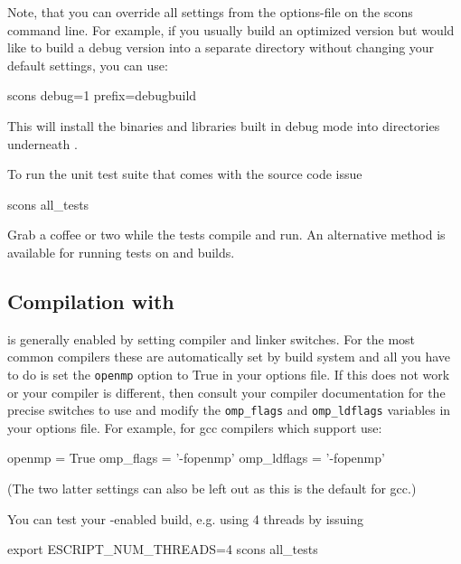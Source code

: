 Note, that you can override all settings from the options-file on the scons
command line. For example, if you usually build an optimized version but would
like to build a debug version into a separate directory without changing your
default settings, you can use:
\begin{shellCode}
scons debug=1 prefix=debugbuild
\end{shellCode}
This will install the binaries and libraries built in debug mode into
directories underneath .

To run the unit test suite that comes with the source code issue
\begin{shellCode}
scons all_tests
\end{shellCode}
Grab a coffee or two while the tests compile and run.
An alternative method is available for running tests on \openmp and \mpi builds.

\subsection{Compilation with \openmp}
\openmp is generally enabled by setting compiler and linker switches. For the
most common compilers these are automatically set by build system and all you
have to do is set the \texttt{openmp} option to True in your options file. If
this does not work or your compiler is different, then consult your compiler
documentation for the precise switches to use and modify the \texttt{omp_flags}
and \texttt{omp_ldflags} variables in your options file.
For example, for gcc compilers which support \openmp use:
\begin{shellCode}
openmp = True
omp_flags = '-fopenmp'
omp_ldflags = '-fopenmp'
\end{shellCode}
(The two latter settings can also be left out as this is the default for gcc.)

You can test your \openmp-enabled build, e.g. using 4 threads by issuing
\begin{shellCode}
export ESCRIPT_NUM_THREADS=4
scons all_tests
\end{shellCode}

